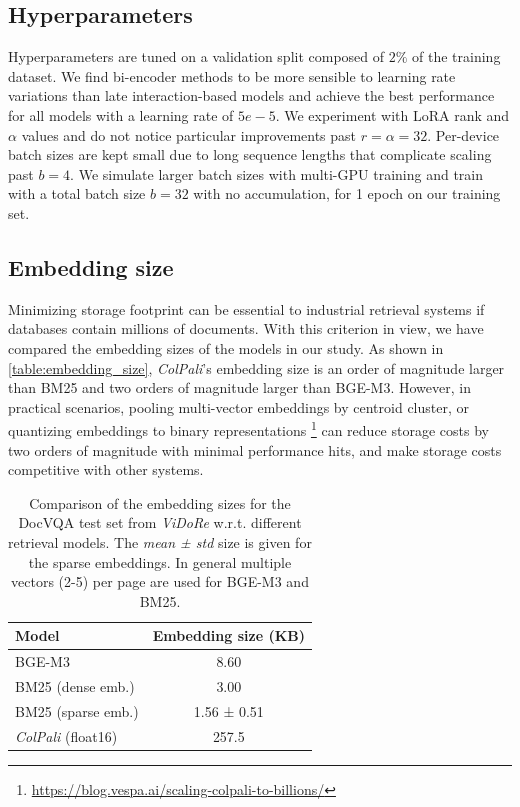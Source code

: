 \documentclass{article} %
\begin{document}
\subsection{Hyperparameters}

Hyperparameters are tuned on a validation split composed of $2\%$ of the training dataset. We find bi-encoder methods to be more sensible to learning rate variations than late interaction-based models and achieve the best performance for all models with a learning rate of $5e-5$. We experiment with LoRA rank and $\alpha$ values and do not notice particular improvements past $r = \alpha = 32$. Per-device batch sizes are kept small due to long sequence lengths that complicate scaling past $b=4$. We simulate larger batch sizes with multi-GPU training and train with a total batch size $b=32$ with no accumulation, for 1 epoch on our training set.


\subsection{Embedding size}
\label{subsection:embedding_size}

Minimizing storage footprint can be essential to industrial retrieval systems if databases contain millions of documents. With this criterion in view, we have compared the embedding sizes of the models in our study. As shown in \autoref{table:embedding_size}, \textit{ColPali}’s embedding size is an order of magnitude larger than BM25 and two orders of magnitude larger than BGE-M3. However, in practical scenarios, pooling multi-vector embeddings by centroid cluster, or quantizing embeddings to binary representations \footnote{\url{https://blog.vespa.ai/scaling-colpali-to-billions/}} can reduce storage costs by two orders of magnitude \citep{santhanam_plaid_2022} with minimal performance hits, and make storage costs competitive with other systems.

\begin{table}[ht]
    \centering
    \begin{tabular}{l|c}
    \textbf{Model}              & \textbf{Embedding size (KB)} \\
    \hline
    BGE-M3             & 8.60               \\
    BM25 (dense emb.)  & 3.00                \\
    BM25 (sparse emb.) & 1.56 ± 0.51         \\
    \textit{ColPali} (float16)            & 257.5              \\
    \end{tabular}
    \caption{Comparison of the embedding sizes for the DocVQA test set from \textit{ViDoRe} w.r.t. different retrieval models. The \textit{mean ± std} size is given for the sparse embeddings. In general multiple vectors (2-5) per page are used for BGE-M3 and BM25.}
    \label{table:embedding_size}
\end{table}
\end{document}
